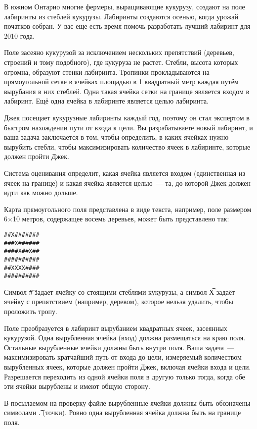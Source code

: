 В южном Онтарио многие фермеры, выращивающие кукурузу,
создают на поле лабиринты из стеблей кукурузы. Лабиринты создаются осенью, когда урожай початков собран. У вас еще есть время помочь разработать лучший лабиринт для 2010 года.

Поле засеяно кукурузой за исключением нескольких препятствий (деревьев, строений и тому подобного), где кукуруза не растет. Стебли, высота которых огромна, образуют стенки лабиринта. Тропинки прокладываются на прямоугольной сетке в ячейках площадью в 1 квадратный метр каждая путём вырубания в них стеблей. Одна такая ячейка сетки на границе является входом в лабиринт. Ещё одна ячейка в лабиринте является целью лабиринта.

Джек посещает кукурузные лабиринты каждый год, поэтому он стал экспертом в быстром нахождении пути от входа к цели. Вы разрабатываете новый лабиринт, и ваша задача заключается в том, чтобы определить, в каких ячейках нужно вырубить стебли, чтобы максимизировать количество ячеек в лабиринте, которые должен пройти Джек.

Система оценивания определит, какая ячейка является входом (единственная из ячеек на границе) и какая ячейка является целью~--- та, до которой Джек должен идти как можно дольше.

Карта прямоугольного поля представлена в виде текста, например, поле размером 6×10 метров, содержащее восемь деревьев, может быть представлено так:

\begin{verbatim}
##X#######
###X######
####X##X##
##########
##XXXX####
##########
\end{verbatim}

Символ \t{\#} задает ячейку со стоящими стеблями кукурузы, а символ \t{X} задаёт ячейку с препятствием (например, деревом), которое нельзя удалить, чтобы проложить тропу.

Поле преобразуется в лабиринт вырубанием квадратных ячеек, засеянных кукурузой. Одна вырубленная ячейка (вход) должна размещаться на краю поля. Остальные вырубленные ячейки должны быть внутри поля. Ваша задача~--- максимизировать кратчайший путь от входа до цели, измеряемый количеством вырубленных ячеек, которые должен пройти Джек, включая ячейки входа и цели. Разрешается переходить из одной ячейки поля в другую только тогда, когда обе эти ячейки вырублены и имеют общую сторону.

В посылаемом на проверку файле вырубленные ячейки должны быть обозначены
символами \t{.} (точки). Ровно одна вырубленная ячейка должна быть на границе поля.

